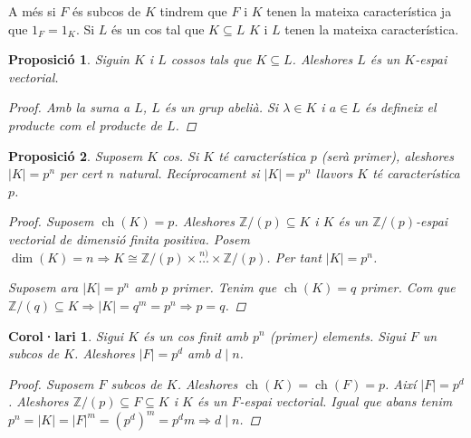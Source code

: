 \documentclass[a4paper,11pt]{report}
\renewcommand{\div}{\mid}
\newcommand{\ordre}[1]{|#1|}
\DeclareMathOperator{\ch}{ch}
\newcommand{\im}{\Rightarrow}
\theoremstyle{theorem}
\newtheorem{proposicio}{\normalfont \sffamily\bfseries Proposició}[section]
\newtheorem{col}{\normalfont \sffamily\bfseries Corol·lari}[section]
\theoremstyle{definition}
\begin{document}
A més si ${F}$ és subcos de $K$ tindrem que ${F}$ i ${K}$ tenen la mateixa característica ja que $1_{F}=1_K$. Si $L$ és un cos tal que $K\subseteq L$ $K$ i $L$ tenen la mateixa característica.
\begin{proposicio}
	Siguin $K$ i $L$ cossos tals que $K\subseteq L$. Aleshores $L$ és un $K$-espai vectorial.
	\begin{proof}
		Amb la suma a $L$, $L$ és un grup abelià. Si $\lambda\in K$ i $a\in L$ és defineix el producte com el producte de $L$.
	\end{proof}
\end{proposicio}
\begin{proposicio}Suposem $K$ cos.
	Si $K$ té característica $p$ (serà primer), aleshores $\ordre{K}=p^n$ per cert $n$ natural. Recíprocament si $\ordre{K}=p^n$ llavors $K$ té característica $p$.
	\begin{proof}
		Suposem $\ch(K)=p$. Aleshores $\mathbb{Z}/(p)\subseteq K$ i $K$ és un $\mathbb{Z}/(p)$-espai vectorial de dimensió finita positiva. Posem $\dim(K)=n\im K\cong \mathbb{Z}/(p)\times\stackrel{n)}\ldots\times\mathbb{Z}/(p)$. Per tant $\ordre{K}=p^n$.
		
		Suposem ara $\ordre{K}=p^n$ amb $p$ primer. Tenim que $\ch(K)=q$ primer. Com que $\mathbb{Z}/(q)\subseteq K\im \ordre{K}=q^m=p^n\im p=q$.
	\end{proof}
\end{proposicio}
\begin{col}Sigui $K$ és un cos finit amb $p^n$ (primer) elements. Sigui $F$ un subcos de $K$. Aleshores $\ordre{F}=p^d$ amb $d\mid n$.
	\begin{proof}
		Suposem $F$ subcos de $K$. Aleshores $\ch(K)=\ch(F)=p$. Així $\ordre{F}=p^d$. Aleshores $\mathbb{Z}/(p)\subseteq F\subseteq K$ i $K$ és un $F$-espai vectorial. Igual que abans tenim $p^n=\ordre{K}=\ordre{F}^m=(p^d)^m=p^dm\im d\div n$.
	\end{proof}
\end{col}
\end{document}
